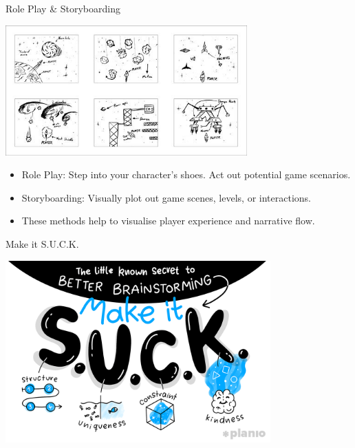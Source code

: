 \documentclass[10pt]{beamer}
\begin{document}

\begin{frame}{Role Play \& Storyboarding}
\begin{center}
\includegraphics[height=5cm]{images/gamesketch}
\end{center}
\begin{itemize}
\item Role Play: Step into your character's shoes. Act out potential game scenarios.
\item Storyboarding: Visually plot out game scenes, levels, or interactions.
\item These methods help to visualise player experience and narrative flow.
\end{itemize}
\end{frame}

\begin{frame}{Make it S.U.C.K.}
\begin{center}
\includegraphics[height=7cm]{images/suck}
\end{center}

\end{frame}

\end{document}
